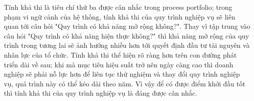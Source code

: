 Tính khả thi là tiêu chí thứ ba được cân nhắc trong process portfolio; trong phạm vi ngữ cảnh của hệ thống, tính khả thi của quy trình nghiệp vụ sẽ liên quan tới câu hỏi "Quy trình có khả năng mở rộng không?". Thay vì tập trung vào câu hỏi "Quy trình có khả năng hiện thực không?" thì khả năng mở rộng của quy trình trong tương lai sẽ ảnh hưởng nhiều hơn tới quyết định đầu tư tài nguyên và nhân lực của tổ chức. Tính khả thi thể hiện rõ ràng hơn trên con đường phát triển dài về sau; khi mà mục tiêu hiệu suất trở nên ngày càng cao thì doanh nghiệp sẽ phải nỗ lực hơn để liên tục thử nghiệm và thay đổi quy trình nghiệp vụ, quá trình này có thể kéo dài theo năm. Vì vậy để có được điểm khởi đầu tốt thì tính khả thi của quy trình nghiệp vụ là đáng được cân nhắc.